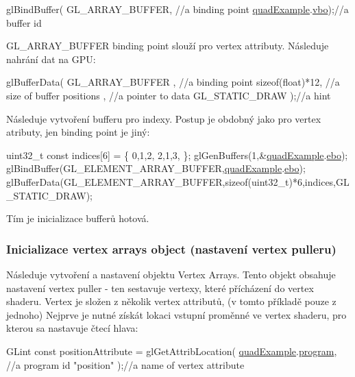 \begin{DoxyCodeInclude}
  glBindBuffer(
      GL\_ARRAY\_BUFFER, \textcolor{comment}{//a binding point}
      \hyperlink{quadExample_8c_ad961415145a9c30bd9846d4a278cc63a}{quadExample}.\hyperlink{structQuadExampleVariables_a69515fd546272c117e14f784221f6412}{vbo});\textcolor{comment}{//a buffer id}
\end{DoxyCodeInclude}
G\-L\-\_\-\-A\-R\-R\-A\-Y\-\_\-\-B\-U\-F\-F\-E\-R binding point slouží pro vertex attributy. Následuje nahrání dat na G\-P\-U\-: 
\begin{DoxyCodeInclude}
  glBufferData(
      GL\_ARRAY\_BUFFER , \textcolor{comment}{//a binding point}
      \textcolor{keyword}{sizeof}(\textcolor{keywordtype}{float})*12, \textcolor{comment}{//a size of buffer}
      positions       , \textcolor{comment}{//a pointer to data}
      GL\_STATIC\_DRAW  );\textcolor{comment}{//a hint}
\end{DoxyCodeInclude}
Následuje vytvoření bufferu pro indexy. Postup je obdobný jako pro vertex atributy, jen binding point je jiný\-: 
\begin{DoxyCodeInclude}
  uint32\_t \textcolor{keyword}{const} indices[6] = \{
    0,1,2,
    2,1,3,
  \};
  glGenBuffers(1,&\hyperlink{quadExample_8c_ad961415145a9c30bd9846d4a278cc63a}{quadExample}.\hyperlink{structQuadExampleVariables_a3b1abdb0f18593a0ebec8dd9a222164b}{ebo});
  glBindBuffer(GL\_ELEMENT\_ARRAY\_BUFFER,\hyperlink{quadExample_8c_ad961415145a9c30bd9846d4a278cc63a}{quadExample}.\hyperlink{structQuadExampleVariables_a3b1abdb0f18593a0ebec8dd9a222164b}{ebo});
  glBufferData(GL\_ELEMENT\_ARRAY\_BUFFER,\textcolor{keyword}{sizeof}(uint32\_t)*6,indices,GL\_STATIC\_DRAW);
\end{DoxyCodeInclude}
Tím je inicializace bufferů hotová. \hypertarget{quadExample.c_VAO}{}\subsubsection{Inicializace vertex arrays object (nastavení vertex pulleru)}\label{quadExample.c_VAO}
Následuje vytvoření a nastavení objektu Vertex Arrays. Tento objekt obsahuje nastavení vertex puller -\/ ten sestavuje vertexy, které přícházení do vertex shaderu. Vertex je složen z několik vertex attributů, (v tomto příkladě pouze z jednoho) Nejprve je nutné získát lokaci vstupní proměnné ve vertex shaderu, pro kterou sa nastavuje čtecí hlava\-: 
\begin{DoxyCodeInclude}
  GLint \textcolor{keyword}{const} positionAttribute = glGetAttribLocation(
      \hyperlink{quadExample_8c_ad961415145a9c30bd9846d4a278cc63a}{quadExample}.\hyperlink{structQuadExampleVariables_a63971781ff860bd201886926f943ba78}{program}, \textcolor{comment}{//a program id}
      \textcolor{stringliteral}{"position"}         );\textcolor{comment}{//a name of vertex attribute}
\end{DoxyCodeInclude}
